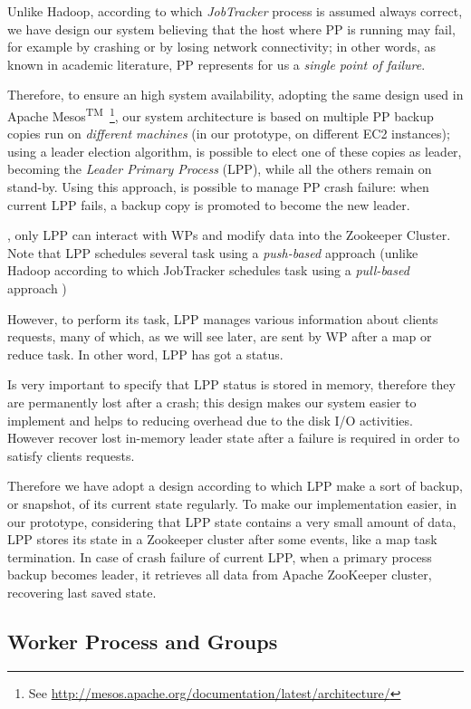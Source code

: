\documentclass[sigchi]{acmart}
\begin{document}
Unlike Hadoop, according to which \textit{JobTracker} process is assumed always correct, we have design our system believing that the host where PP is running may fail, for example by crashing or by losing network connectivity; in other words, as known in academic literature, PP represents for us a \textit{single point of failure}.

Therefore, to ensure an high system availability, adopting the same design used in Apache Mesos\textsuperscript{TM}\ \footnote{See \url{http://mesos.apache.org/documentation/latest/architecture/}}, our system architecture is based on multiple PP backup copies run on \textit{different machines} (in our prototype, on different EC2 instances); using a leader election algorithm, is possible to elect one of these copies as leader, becoming the \textit{Leader Primary Process} (LPP), while all the others remain on stand-by. Using this approach, is possible to manage PP crash failure: when current LPP fails, a backup copy is promoted to become the new leader. 

, only LPP can interact with WPs and modify data into the Zookeeper Cluster. Note that LPP schedules several task using a \textit{push-based} approach (unlike Hadoop according to which JobTracker schedules task using a \textit{pull-based} approach \cite{LARTS})

However, to perform its task, LPP manages various information about clients requests, many of which, as we will see later, are sent by WP after a map or reduce task. In other word, LPP has got a status.

Is very important to specify that LPP status is stored in memory, therefore they are permanently lost after a crash; this design makes our system easier to implement and helps to reducing overhead due to the disk I/O activities. However recover lost in-memory leader state after a failure is required in order to satisfy clients requests. 

Therefore we have adopt a design according to which LPP make a sort of backup, or snapshot, of its current state regularly. To make our implementation easier, in our prototype, considering that LPP state contains a very small amount of data, LPP stores its state in a Zookeeper cluster after some events, like a map task termination. In case of crash failure of current LPP, when a primary process backup becomes leader, it retrieves all data from Apache ZooKeeper cluster, recovering last saved state.

\subsection{Worker Process and Groups}
\end{document}
